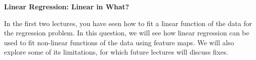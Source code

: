 \item {} {\bf Linear Regression: Linear in What?}

In the first two lectures, you have seen how to fit a linear function of the data for the regression problem.  In this question, we will see how linear regression can be used to fit non-linear functions of the data using feature maps. We will also explore some of its limitations, for which future lectures will discuss fixes.

\begin{enumerate}
	
        \ifnum{} {
	  
        }\fi

	
        \ifnum{} {
	  
        }\fi

	
        \ifnum{} {
	  
        }\fi

        
        \ifnum{} {
	  
        }\fi

        
        \ifnum{} {
	  
        }\fi
\end{enumerate}
